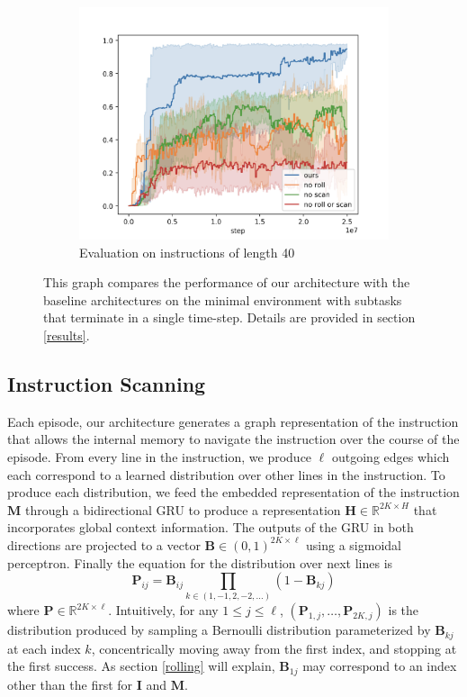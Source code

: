 \documentclass{article}
\begin{document}
\begin{figure}[th]
\begin{subfigure}{.33\textwidth}
    \centerline{\includegraphics[width=\columnwidth]{figures/eval40}}
    \caption{Evaluation on instructions of length 40}
  \end{subfigure}%
  \caption{This graph compares the performance of our architecture with the
baseline architectures on the minimal environment with subtasks that terminate
in a single time-step.
Details are provided in section \ref{results}.}
  \label{minimal}
\end{figure}

\subsection{Instruction Scanning}\label{scanning}
Each episode, our architecture generates a graph representation of the
instruction that allows the internal memory to navigate the instruction over the
course of the episode.  From every line in the instruction, we produce
$\ell$ outgoing edges which each correspond to a learned distribution over other lines
in the instruction. To produce each distribution, we feed the embedded representation
of the instruction $\mathbf{M}$ through a bidirectional GRU to produce a
representation $\mathbf{H} \in \mathbb{R}^{2K \times H}$ 
that incorporates global context information. The outputs of the GRU in both
directions are projected to a vector $\mathbf{B} \in (0, 1)^{2K\times \ell
 }$ using a sigmoidal
perceptron. Finally the equation for the distribution over next lines is
\begin{equation}
  \label{P}
  \mathbf{P}_{ij} = \mathbf{B}_{ij}\prod_{k \in (1, -1, 2, -2, \dots)}\left(1 -
  \mathbf{B}_{kj}\right)
\end{equation}
where $\mathbf{P} \in \mathbb{R}^{2K\times\ell }$. Intuitively, for any $1\le j
\le \ell$, 
$\left(\mathbf{P}_{1,j}, \dots, \mathbf{P}_{2K,j}\right)$ is the distribution produced by
sampling a Bernoulli distribution parameterized by $\mathbf{B}_{kj}$ at each index
$k$, concentrically moving away from the first index, and stopping at the first success.
As section \ref{rolling} will explain, $\mathbf{B}_{1j}$ may
correspond to an index other than the first for $\mathbf{I}$ and $\mathbf{M}$.
\end{document}
